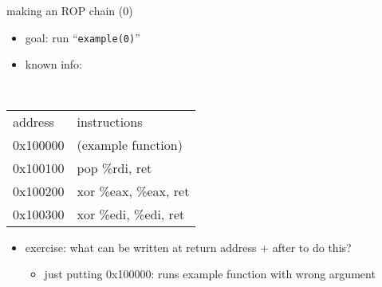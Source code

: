 \begin{frame}[fragile,label=makerop0]{making an ROP chain (0)}
    \begin{itemize}
    \item goal: run ``\texttt{example(0)}''
    \item known info:
    \end{itemize}
\small \tt
\begin{tabular}{ll}
\normalfont address & \normalfont instructions \\
0x100000 & (example function) \\
0x100100 & pop \%rdi, ret \\
0x100200 & xor \%eax, \%eax, ret \\
0x100300 & xor \%edi, \%edi, ret \\
\end{tabular}
\begin{itemize}
\item exercise: what can be written at return address + after to do this?
    \begin{itemize}
    \item just putting 0x100000: runs example function with wrong argument
    \end{itemize}
\end{itemize}
\end{frame}

